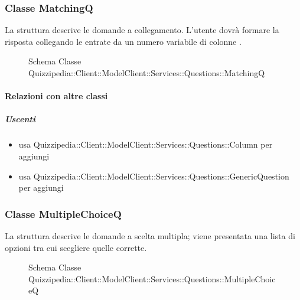 \subsubsection{Classe MatchingQ}
La struttura descrive le domande a collegamento. L'utente dovrà formare la risposta collegando le entrate da un numero variabile di colonne .
\begin{figure}[H]
\centering
\noindent{}
\caption[Schema Classe MatchingQ]{Schema Classe Quizzipedia::Client::ModelClient::Services::Questions::MatchingQ}
\end{figure}
\paragraph{Relazioni con altre classi}
\subparagraph{Uscenti}
\begin{itemize}
\item usa Quizzipedia::Client::ModelClient::Services::Questions::Column per aggiungi
\item usa Quizzipedia::Client::ModelClient::Services::Questions::GenericQuestion per aggiungi
\end{itemize}
\subsubsection{Classe MultipleChoiceQ}
La struttura descrive le domande a scelta multipla; viene presentata una lista di opzioni tra cui scegliere quelle corrette.
\begin{figure}[H]
\centering
\noindent{}
\caption[Schema Classe MultipleChoiceQ]{Schema Classe Quizzipedia::Client::ModelClient::Services::Questions::MultipleChoiceQ}
\end{figure}
